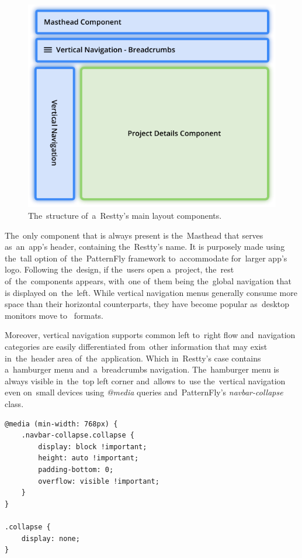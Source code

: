 \begin{figure}[!hbt]
	\centering
	\includegraphics[scale=0.7]{./figures/layout.pdf}
	\caption{The~structure of~a~Restty's main layout components.}
	\label{fig-layout}
\end{figure}

The~only component that is always present is the~Masthead that serves as~an~app's header, containing
the~Restty's name. It is purposely made using the~tall option of~the~PatternFly framework to~accommodate
for~larger app's logo. Following the~design, if the~users open a~project, the~rest of~the~components appears, 
with~one of~them being the~global navigation that is displayed on~the~left. While vertical navigation menus
generally consume more space than their horizontal counterparts, they have become popular as~desktop monitors
move to~ formats. 

Moreover, vertical navigation supports common left to~right flow
and~navigation categories are easily differentiated from~other information that may exist in~the~header area
of~the~application. Which in~Restty's case contains a~hamburger menu and~a~breadcrumbs navigation. 
The~hamburger menu is always visible in~the~top left corner and~allows to~use the~vertical navigation even
on~small devices using \textit{@media} queries and~PatternFly's \textit{navbar-collapse} class.

\vspace{1mm}
\begin{lstlisting}[caption=Media queries on the .navbar-collapse class that enables the~navbar
to~work even on~small devices., style=dp-default]
@media (min-width: 768px) {
	.navbar-collapse.collapse {
		display: block !important;
		height: auto !important;
		padding-bottom: 0;
		overflow: visible !important;
	}
}

.collapse {
	display: none;
}
\end{lstlisting}

